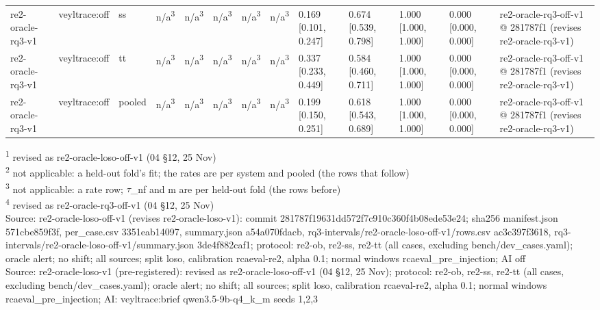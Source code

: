 \begin{table}[t]
\begin{tabular}{lllllllllllll}
re2-oracle-rq3-v1 & veyltrace:off & ss & n/a\textsuperscript{3} & n/a\textsuperscript{3} & n/a\textsuperscript{3} & n/a\textsuperscript{3} & n/a\textsuperscript{3} & 0.169 [0.101, 0.247] & 0.674 [0.539, 0.798] & 1.000 [1.000, 1.000] & 0.000 [0.000, 0.000] & re2-oracle-rq3-off-v1 @ 281787f1 (revises re2-oracle-rq3-v1) \\
re2-oracle-rq3-v1 & veyltrace:off & tt & n/a\textsuperscript{3} & n/a\textsuperscript{3} & n/a\textsuperscript{3} & n/a\textsuperscript{3} & n/a\textsuperscript{3} & 0.337 [0.233, 0.449] & 0.584 [0.460, 0.711] & 1.000 [1.000, 1.000] & 0.000 [0.000, 0.000] & re2-oracle-rq3-off-v1 @ 281787f1 (revises re2-oracle-rq3-v1) \\
re2-oracle-rq3-v1 & veyltrace:off & pooled & n/a\textsuperscript{3} & n/a\textsuperscript{3} & n/a\textsuperscript{3} & n/a\textsuperscript{3} & n/a\textsuperscript{3} & 0.199 [0.150, 0.251] & 0.618 [0.543, 0.689] & 1.000 [1.000, 1.000] & 0.000 [0.000, 0.000] & re2-oracle-rq3-off-v1 @ 281787f1 (revises re2-oracle-rq3-v1) \\
\hline
\end{tabular}
\par\smallskip\footnotesize
\textsuperscript{1} revised as re2-oracle-loso-off-v1 (04 \S{}12, 25 Nov)\\
\textsuperscript{2} not applicable: a held-out fold's fit; the rates are per system and pooled (the rows that follow)\\
\textsuperscript{3} not applicable: a rate row; $\tau$\_nf and m are per held-out fold (the rows before)\\
\textsuperscript{4} revised as re2-oracle-rq3-off-v1 (04 \S{}12, 25 Nov)\\
Source: re2-oracle-loso-off-v1 (revises re2-oracle-loso-v1): commit 281787f19631dd572f7c910c360f4b08ede53e24; sha256 manifest.json 571cbe859f3f, per\_case.csv 3351eab14097, summary.json a54a070fdacb, rq3-intervals/re2-oracle-loso-off-v1/rows.csv ac3c397f3618, rq3-intervals/re2-oracle-loso-off-v1/summary.json 3de4f882caf1; protocol: re2-ob, re2-ss, re2-tt (all cases, excluding bench/dev\_cases.yaml); oracle alert; no shift; all sources; split loso, calibration rcaeval-re2, alpha 0.1; normal windows rcaeval\_pre\_injection; AI off\\
Source: re2-oracle-loso-v1 (pre-registered): revised as re2-oracle-loso-off-v1 (04 \S{}12, 25 Nov); protocol: re2-ob, re2-ss, re2-tt (all cases, excluding bench/dev\_cases.yaml); oracle alert; no shift; all sources; split loso, calibration rcaeval-re2, alpha 0.1; normal windows rcaeval\_pre\_injection; AI: veyltrace:brief qwen3.5-9b-q4\_k\_m seeds 1,2,3\\

\end{table}
